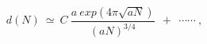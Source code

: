 \begin{equation}\label{11}  
d(N) ~ \simeq ~C  ~\frac{a~exp\left( 4\pi \sqrt{aN}\right)}{(aN)^{3/4}} ~~+~~ \cdots
\cdots~, 
\end{equation} 
